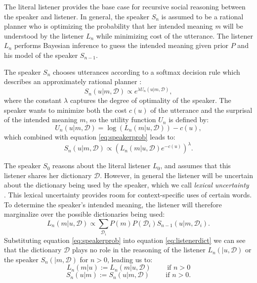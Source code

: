 \documentclass{article} %
\newcommand{\dictionary}{\ensuremath{\mathcal{D}}\xspace}
\begin{document}
The literal listener provides the base case for recursive social reasoning between the speaker and listener. In general, the speaker $S_n$ is assumed to be a rational planner who is optimizing the probability that her intended meaning \emph{m} will be understood by the listener $L_n$ while minimizing cost of the utterance. The listener $L_n$ performs Bayesian inference to guess the intended meaning given prior $P$ and his model of the speaker $S_{n-1}$.

The speaker $S_n$ chooses utterances according to a softmax decision rule which describes an approximately rational planner \cite{sutton1998reinforcement}:
\begin{equation}\label{eq:speakerprob}
S_n(u | m,\dictionary) \propto e^{\lambda U_n(u | m,\dictionary)},
\end{equation}
where the constant $\lambda$ captures the degree of optimality of the speaker. 
The speaker wants to minimize both the cost $c(u)$ of the utterance and the surprisal of the intended meaning $m$, so the utility function $U_n$ is defined by:
\begin{equation}\label{eq:speakerutility}
U_n(u | m, \dictionary) = \log (L_{n}(m | u, \dictionary)) - c(u),
\end{equation}
which combined with equation \ref{eq:speakerprob} leads to:
\begin{equation}
S_n(u | m, \dictionary) \propto (L_{n}(m | u,\dictionary)e^{-c(u)}) ^\lambda.
\end{equation}

The speaker $S_0$ reasons about the literal listener $L_0$, and assumes that this listener shares her dictionary $\dictionary$. However, in general the listener will be uncertain about the dictionary being used by the speaker, which we call \emph{lexical uncertainty} \cite{bergen2012}. This lexical uncertainty provides room for context-specific uses of certain words. To determine the speaker's intended meaning, the listener will therefore marginalize over the possible dictionaries being used:
\begin{equation}\label{eq:listenerdict}
L_n(m|u,\dictionary) \propto \sum_{\dictionary_i }P(m)P(\dictionary_i)S_{n-1}(u | m,\dictionary_i).
\end{equation}
Substituting equation \ref{eq:speakerprob} into equation \ref{eq:listenerdict} we can see that the dictionary $\dictionary$ plays no role in the reasoning of the listener $L_n(|u,\dictionary)$ or the speaker $S_n(| m, \dictionary)$ for $n>0$, leading us to:
\begin{equation}
  L_n(m | u) :=  L_n(m | u, \dictionary) \text{ ~~~~~ if $n > 0$}
\end{equation}
\begin{equation}
  S_n(u | m) :=  S_n(u | m, \dictionary) \text{ ~~~~~ if $n > 0$.}
\end{equation}
\end{document}
